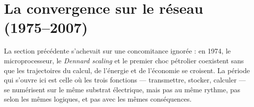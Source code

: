  
\section{La convergence sur le réseau (1975--2007)}\label{sec:convergence}
 
La section précédente s'achevait sur une concomitance ignorée : en 1974, le microprocesseur, le \emph{Dennard scaling} et le premier choc pétrolier coexistent sans que les trajectoires du calcul, de l'énergie et de l'économie se croisent. La période qui s'ouvre ici est celle où les trois fonctions --- transmettre, stocker, calculer --- se numérisent sur le même substrat électrique, mais pas au même rythme, pas selon les mêmes logiques, et pas avec les mêmes conséquences.
 
